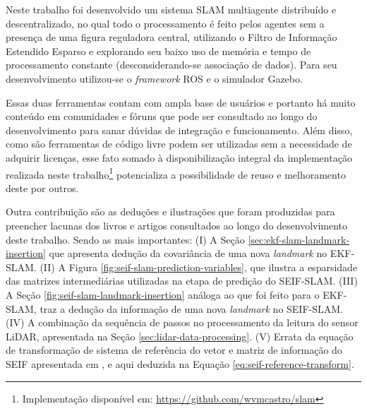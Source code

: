 Neste trabalho foi desenvolvido um sistema SLAM multiagente distribuído e 
descentralizado, no qual todo o processamento é feito pelos agentes sem a presença de uma figura reguladora central, utilizando o Filtro de Informação Estendido Esparso e explorando seu baixo uso de memória e tempo de processamento constante (desconsiderando-se associação de dados). Para seu desenvolvimento utilizou-se o \textit{framework} ROS e o 
simulador Gazebo.

Essas duas ferramentas contam com ampla base de usuários e portanto há 
muito conteúdo em comunidades e fóruns que pode ser consultado ao longo 
do desenvolvimento para sanar dúvidas de integração e funcionamento. 
Além disso, como são ferramentas de código livre podem ser utilizadas 
sem a necessidade de adquirir licenças, esse fato somado à 
disponibilização integral da implementação realizada neste trabalho\footnote{Implementação disponível em: \url{https://github.com/wvmcastro/slam}} potencializa a 
possibilidade de reuso e melhoramento deste por outros. 

Outra contribuição são as deduções e ilustrações que 
foram produzidas para preencher lacunas dos livros e artigos 
consultados ao longo do desenvolvimento deste trabalho. Sendo as mais importantes: (I) A 
Seção \ref{sec:ekf-slam-landmark-insertion} que apresenta dedução da 
covariância de uma nova \textit{landmark} no EKF-SLAM. (II) A Figura 
\ref{fig:seif-slam-prediction-variables}, que ilustra a esparsidade das 
matrizes intermediárias utilizadas na etapa de predição do SEIF-SLAM. 
(III) A Seção \ref{fig:seif-slam-landmark-insertion} análoga ao que 
foi feito para o EKF-SLAM, traz a dedução da informação de uma nova 
\textit{landmark} no SEIF-SLAM. (IV) A combinação da sequência de passos 
no processamento da leitura do sensor LiDAR, apresentada na Seção \ref{sec:lidar-data-processing}. (V) Errata da equação de transformação de 
sistema de referência do vetor e matriz de informação do SEIF 
apresentada em \cite[Seção.~12.11.2]{thrun2005probabilistic}, e aqui 
deduzida na Equação \ref{eq:seif-reference-transform}.


